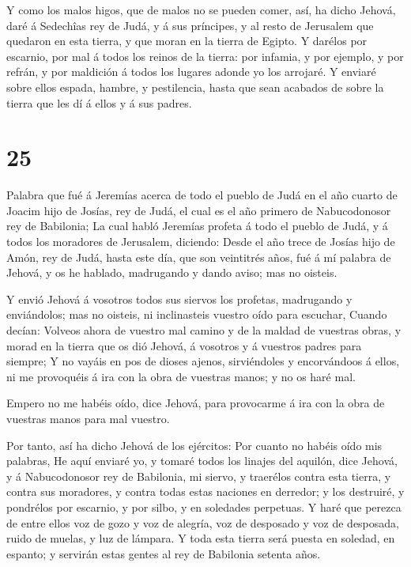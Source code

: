  Y como los malos higos, que de malos no se pueden comer,
así, ha dicho Jehová, daré á Sedechîas rey de Judá, y á sus príncipes, y
al resto de Jerusalem que quedaron en esta tierra, y que moran en la
tierra de Egipto.  Y darélos por escarnio, por mal á todos
los reinos de la tierra: por infamia, y por ejemplo, y por refrán, y por
maldición á todos los lugares adonde yo los arrojaré.  Y
enviaré sobre ellos espada, hambre, y pestilencia, hasta que sean
acabados de sobre la tierra que les dí á ellos y á sus padres.

\hypertarget{section-24}{%
\section{25}\label{section-24}}

 Palabra que fué á Jeremías acerca de todo el pueblo de Judá
en el año cuarto de Joacim hijo de Josías, rey de Judá, el cual es el
año primero de Nabucodonosor rey de Babilonia;  La cual
habló Jeremías profeta á todo el pueblo de Judá, y á todos los moradores
de Jerusalem, diciendo:  Desde el año trece de Josías hijo
de Amón, rey de Judá, hasta este día, que son veintitrés años, fué á mí
palabra de Jehová, y os he hablado, madrugando y dando aviso; mas no
oisteis.

 Y envió Jehová á vosotros todos sus siervos los profetas,
madrugando y enviándolos; mas no oisteis, ni inclinasteis vuestro oído
para escuchar,  Cuando decían: Volveos ahora de vuestro mal
camino y de la maldad de vuestras obras, y morad en la tierra que os dió
Jehová, á vosotros y á vuestros padres para siempre;  Y no
vayáis en pos de dioses ajenos, sirviéndoles y encorvándoos á ellos, ni
me provoquéis á ira con la obra de vuestras manos; y no os haré mal.

 Empero no me habéis oído, dice Jehová, para provocarme á
ira con la obra de vuestras manos para mal vuestro.

 Por tanto, así ha dicho Jehová de los ejércitos: Por cuanto
no habéis oído mis palabras,  He aquí enviaré yo, y tomaré
todos los linajes del aquilón, dice Jehová, y á Nabucodonosor rey de
Babilonia, mi siervo, y traerélos contra esta tierra, y contra sus
moradores, y contra todas estas naciones en derredor; y los destruiré, y
pondrélos por escarnio, y por silbo, y en soledades perpetuas.
 Y haré que perezca de entre ellos voz de gozo y voz de
alegría, voz de desposado y voz de desposada, ruido de muelas, y luz de
lámpara.  Y toda esta tierra será puesta en soledad, en
espanto; y servirán estas gentes al rey de Babilonia setenta años.

